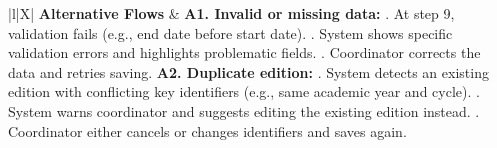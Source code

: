 \begin{xltabular}{\textwidth}{|l|X|}
    \textbf{Alternative Flows} &
        \textbf{A1. Invalid or missing data:} . At step 9, validation fails (e.g., end date before start date). . System shows specific validation errors and highlights problematic fields. . Coordinator corrects the data and retries saving. \newline
        \textbf{A2. Duplicate edition:} . System detects an existing edition with conflicting key identifiers (e.g., same academic year and cycle). . System warns coordinator and suggests editing the existing edition instead. . Coordinator either cancels or changes identifiers and saves again. \\ \hline
\end{xltabular}

